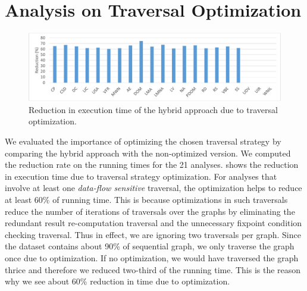 
\chapter{Analysis on Traversal Optimization}
\label{sec:analysis-traversal-opt}

\begin{figure}
\centering
\includegraphics[width=\linewidth]{figures/hybrid-optimization}
\caption{Reduction in execution time of the hybrid approach due to traversal optimization.}%
\label{fig:hy-opt-off}%
\end{figure}

We evaluated the importance of optimizing the chosen traversal strategy by 
comparing the hybrid approach with the non-optimized version. We computed 
the reduction rate on the running times for the 21 analyses. 
 shows the reduction in execution time due to 
traversal strategy optimization. For analyses that involve at least one 
\textit{data-flow sensitive} traversal, the optimization helps to reduce at 
least 60\% of running time. This is because optimizations in such traversals 
reduce the number of iterations of traversals over the graphs by eliminating 
the redundant result re-computation traversal and the
unnecessary fixpoint condition checking traversal. Thus in effect, we are ignoring two traversals per graph. Since the dataset contains about 90\% of sequential graph, we only traverse the graph once due to optimization. If no optimization, we would have traversed the graph thrice and therefore we reduced two-third of the running time. This is the reason why we see about 60\% reduction in time due to optimization.
 
